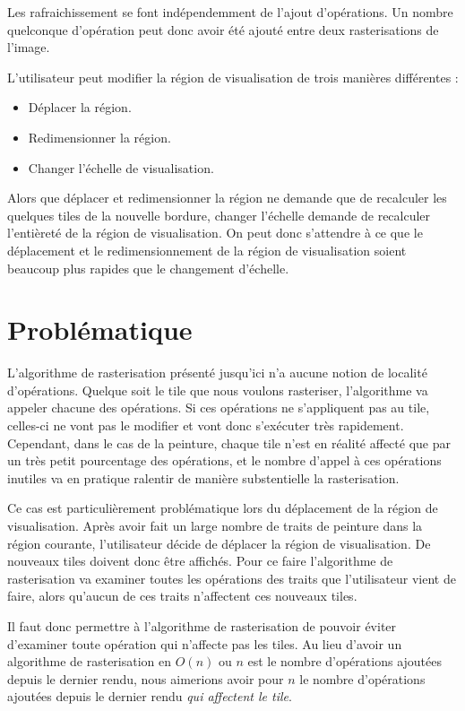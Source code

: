 			Les rafraichissement se font indépendemment de l'ajout d'opérations. Un nombre quelconque
			d'opération peut donc avoir été ajouté entre deux rasterisations de l'image.

			L'utilisateur peut modifier la région de visualisation de trois manières différentes :

			\begin{itemize}
				\item Déplacer la région.
				\item Redimensionner la région.
				\item Changer l'échelle de visualisation.
			\end{itemize}

			Alors que déplacer et redimensionner la région ne demande que de recalculer les quelques tiles de la nouvelle
			bordure, changer l'échelle demande de recalculer l'entièreté de la région de visualisation. On peut
			donc s'attendre à ce que le déplacement et le redimensionnement de la région de visualisation soient 
			beaucoup plus rapides que le changement d'échelle.

	\section{Problématique}
		L'algorithme de rasterisation présenté jusqu'ici n'a aucune notion de localité d'opérations. Quelque soit le tile
		que nous voulons rasteriser, l'algorithme va appeler chacune des opérations. Si ces opérations ne s'appliquent pas
		au tile, celles-ci ne vont pas le modifier et vont donc s'exécuter très rapidement. Cependant, dans le cas de la 
		peinture, chaque tile n'est en réalité affecté que par un très petit pourcentage des opérations, et le nombre
		d'appel à ces opérations inutiles va en pratique ralentir de manière substentielle la rasterisation.

		Ce cas est particulièrement problématique lors du déplacement de la région de visualisation. Après avoir fait
		un large nombre de traits de peinture dans la région courante, l'utilisateur décide de déplacer la région de
		visualisation. De nouveaux tiles doivent donc être affichés. Pour ce faire l'algorithme de rasterisation va 
		examiner toutes les opérations des traits que l'utilisateur vient de faire, alors qu'aucun de ces traits n'affectent
		ces nouveaux tiles. 

		Il faut donc permettre à l'algorithme de rasterisation de pouvoir éviter d'examiner toute opération qui n'affecte
		pas les tiles. Au lieu d'avoir un algorithme de rasterisation en $O(n)$ ou $n$ est le nombre d'opérations
		ajoutées depuis le dernier rendu, nous aimerions avoir pour $n$ le nombre d'opérations ajoutées depuis le dernier
		rendu \emph{qui affectent le tile}.
		

